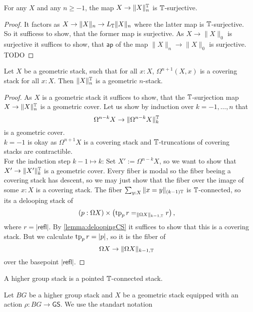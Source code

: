 \documentclass{article}
\newcommand{\refl}{\mathsf{refl}}
\newcommand{\ap}{\mathsf{ap}}
\renewcommand{\GS}{\mathsf{GS}}
\begin{document}
\begin{lemma}
	For any $X$ and any $n \ge -1$, the map $X \to \|X\|_n^{\mathbb{T}}$ is $\mathbb{T}$-surjective.
\end{lemma}
\begin{proof}
	It factors as $X \to \|X\|_n \to L_{\mathbb{T}} \|X\|_n$ where the latter map is $\mathbb{T}$-surjective. So it sufficess to show, that the former map is surjective. As $X \to \|X\|_0$ is surjective it suffices to show, that $\ap$ of the map $\|X\|_n \to \|X\|_0$ is surjective. TODO %
\end{proof}
\begin{prop}
	Let $X$ be a geometric stack, such that for all $x : X$, $\Omega^{n+1} (X , x)$ is a covering stack for all $x : X$. Then $\|X\|_n^{\mathbb{T}}$ is a geometric $n$-stack.
\end{prop}
\begin{proof}
	As $X$ is a geometric stack it suffices to show, that the $\mathbb{T}$-surjection map $X \to \|X\|_n^{\mathbb{T}}$ is a geometric cover.
	Let us show by induction over $k = -1,\hdots,n$ that 
	\[\Omega^{n - k} X \to \|\Omega^{n - k} X\|_k^{\mathbb{T}}\]
	is a geometric cover.  \\
	$k=-1$ is okay as $\Omega^{n+1} X$ is a covering stack and $\mathbb{T}$-truncations of covering stacks are contractible. \\
	For the induction step $k - 1 \mapsto k$:
	Set $X' := \Omega^{n-k} X$, so we want to show that $X' \to \|X'\|_k^{\mathbb{T}}$ is a geometric cover.
	Every fiber is modal so the fiber beeing a covering stack has descent, so we may just show that the fiber over the image of some $x : X$ is a covering stack. The fiber $\sum_{y : X} \| x = y\|_{(k-1)\mathbb{T}}$ is $\mathbb{T}$-connected, so its a delooping stack of 
	\[(p : \Omega X) \times \left(\operatorname{tp}_p r =_{\|\Omega X\|_{k-1,\mathbb{T}}} r  \right),\]
	where $ r= |\refl|$.
	By \ref{lemma:deloopingCS} it suffices to show that this is a covering stack. But we calculate $\operatorname{tp}_p r = |p|$, so it is the fiber of 
	\[
	\Omega X  \to \|\Omega X \|_{k-1, \mathbb{T}}
	\]
	over the basepoint $|\refl|$.
\end{proof}


\begin{definition}
	A higher group stack is a pointed $\mathbb{T}$-connected stack.
\end{definition}
Let $BG$ be a higher group stack and $X$ be a geometric stack equipped with an action $\rho : BG \to \GS$. We use the standart notation
\end{document}
